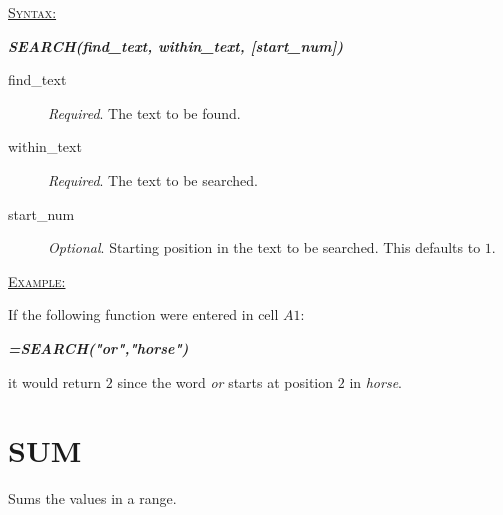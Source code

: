 \begin{addmargin}[1cm]{0cm}
	
	\medskip
	\underline{\textsc{Syntax:}}
	\medskip
	
	{\color{Syntax}
		\noindent\textbf{\textit{SEARCH(find\_text, within\_text, [start\_num])}}
	}
	
	\begin{description}
		\item[find\_text] \textit{Required}. The text to be found.
		\item[within\_text] \textit{Required}. The text to be searched.
		\item[start\_num] \textit{Optional}. Starting position in the text to be searched. This defaults to $ 1 $.
	\end{description}

	\medskip
	\noindent\underline{\textsc{Example:}}
	\medskip
	
	\noindent If the following function were entered in cell $ A1 $:
	
	{\color{Syntax}
		\textit{\textbf{=SEARCH("or","horse")}}
	}
	
	\noindent it would return $ 2 $ since the word \textit{or} starts at position $ 2 $ in \textit{horse}.

\end{addmargin}

\section{SUM}

Sums the values in a range.

